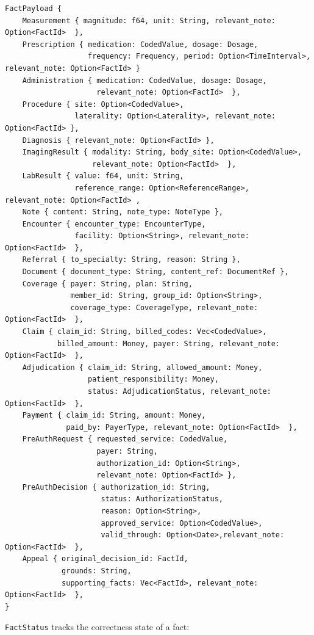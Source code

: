 \documentclass[11pt]{article}
\begin{document}
\begin{lstlisting}
FactPayload {
    Measurement { magnitude: f64, unit: String, relevant_note: Option<FactId>  },
    Prescription { medication: CodedValue, dosage: Dosage,
                   frequency: Frequency, period: Option<TimeInterval>, relevant_note: Option<FactId> }
    Administration { medication: CodedValue, dosage: Dosage,
                     relevant_note: Option<FactId>  },
    Procedure { site: Option<CodedValue>,
                laterality: Option<Laterality>, relevant_note: Option<FactId> },
    Diagnosis { relevant_note: Option<FactId> },
    ImagingResult { modality: String, body_site: Option<CodedValue>,
                    relevant_note: Option<FactId>  },
    LabResult { value: f64, unit: String,
                reference_range: Option<ReferenceRange>, relevant_note: Option<FactId> ,
    Note { content: String, note_type: NoteType },
    Encounter { encounter_type: EncounterType,
                facility: Option<String>, relevant_note: Option<FactId>  },
    Referral { to_specialty: String, reason: String },
    Document { document_type: String, content_ref: DocumentRef },
    Coverage { payer: String, plan: String,
               member_id: String, group_id: Option<String>,
               coverage_type: CoverageType, relevant_note: Option<FactId>  },
    Claim { claim_id: String, billed_codes: Vec<CodedValue>,
            billed_amount: Money, payer: String, relevant_note: Option<FactId>  },
    Adjudication { claim_id: String, allowed_amount: Money,
                   patient_responsibility: Money,
                   status: AdjudicationStatus, relevant_note: Option<FactId>  },
    Payment { claim_id: String, amount: Money,
              paid_by: PayerType, relevant_note: Option<FactId>  },
    PreAuthRequest { requested_service: CodedValue,
                     payer: String,
                     authorization_id: Option<String>,
                     relevant_note: Option<FactId> },
    PreAuthDecision { authorization_id: String,
                      status: AuthorizationStatus,
                      reason: Option<String>,
                      approved_service: Option<CodedValue>,
                      valid_through: Option<Date>,relevant_note: Option<FactId>  },
    Appeal { original_decision_id: FactId,
             grounds: String,
             supporting_facts: Vec<FactId>, relevant_note: Option<FactId>  },
}
\end{lstlisting}

\texttt{FactStatus} tracks the correctness state of a fact:
\end{document}
